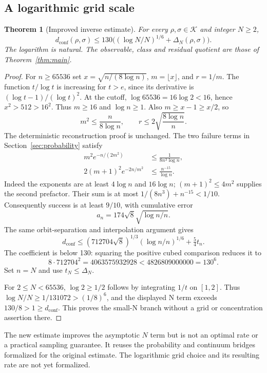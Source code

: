 \documentclass[11pt]{article}
\newtheorem{theorem}{Theorem}[section]
\theoremstyle{remark}
\newcommand{\K}{\mathcal K}
\newcommand{\dc}{d_{\mathrm{conf}}}
\begin{document}
\subsection{A logarithmic grid scale}
\begin{theorem}[Improved inverse estimate]\label{thm:improved}
For every $\rho,\sigma\in\K$ and integer $N\ge2$,
\[
 \dc(\rho,\sigma)\le130\bigl((\log N/N)^{1/6}+\Delta_N(\rho,\sigma)\bigr).
\]
The logarithm is natural. The observable, class and residual quotient
are those of Theorem~\ref{thm:main}.
\end{theorem}
\begin{proof}
For $n\ge65536$ set $x=\sqrt{n/(8\log n)}$, $m=\lfloor x\rfloor$,
and $r=1/m$. The function $t/\log t$ is increasing for $t>e$, since
its derivative is $(\log t-1)/(\log t)^2$. At the cutoff,
$\log65536=16\log2<16$, hence $x^2>512>16^2$.
Thus $m\ge16$ and $\log n\ge1$. Also $m\ge x-1\ge x/2$, so
\[
 m^2\le\frac{n}{8\log n},\qquad
 r\le2\sqrt{\frac{8\log n}{n}}.
\]
The deterministic reconstruction proof is unchanged. The two failure
terms in Section~\ref{sec:probability} satisfy
\begin{align*}
 m^2e^{-n/(2m^2)}&\le\frac{1}{8n^3\log n},\\
 2(m+1)^2e^{-2n/m^2}&\le\frac{n^{-15}}{\log n}.
\end{align*}
Indeed the exponents are at least $4\log n$ and $16\log n$;
$(m+1)^2\le4m^2$ supplies the second prefactor. Their sum is at most
$1/(8n^3)+n^{-15}<1/10$. Consequently success is at least $9/10$,
with cumulative error
\[
 a_n=174\sqrt8\sqrt{\log n/n}.
\]
The same orbit-separation and interpolation argument gives
\[
 \dc\le(712704\sqrt8)^{1/3}(\log n/n)^{1/6}+\tfrac54t_n.
\]
The coefficient is below 130: squaring the positive cubed comparison
reduces it to
\[
 8\cdot712704^2=4063575932928<4826809000000=130^6.
\]
Set $n=N$ and use $t_N\le\Delta_N$.

For $2\le N<65536$, $\log2\ge1/2$ follows by integrating $1/t$
on $[1,2]$. Thus $\log N/N\ge1/131072>(1/8)^6$, and the
displayed N term exceeds $130/8>1\ge\dc$. This proves the small-N
branch without a grid or concentration assertion there.
\end{proof}

The new estimate improves the asymptotic $N$ term but is not an optimal
rate or a practical sampling guarantee. It reuses the probability and
continuum bridges formalized for the original estimate. The logarithmic
grid choice and its resulting rate are not yet formalized.
\end{document}
